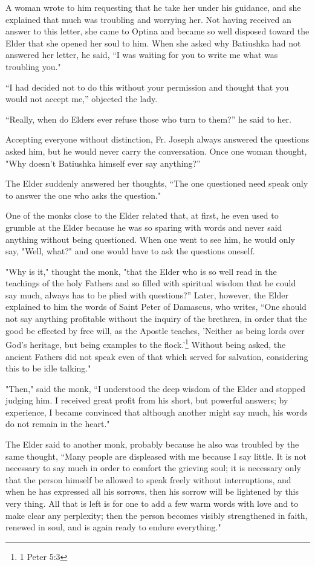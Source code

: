 A woman wrote to him requesting that he take her under his guidance, and she explained that much was troubling and worrying her. Not having received an answer to this letter, she came to Optina and became so well disposed toward the Elder that she opened her soul to him. When she asked why Batiushka had not answered her letter, he said, “I was waiting for you to write me what was troubling you."

“I had decided not to do this without your permission and thought that you would not accept me,'' objected the lady.

“Really, when do Elders ever refuse those who turn to them?” he said to her.

Accepting everyone without distinction, Fr. Joseph always answered the questions asked him, but he would never carry the conversation. Once one woman thought, "Why doesn't Batiushka himself ever say anything?”

The Elder suddenly answered her thoughts, “The one questioned need speak only to answer the one who asks the question."

One of the monks close to the Elder related that, at first, he even used to grumble at the Elder because he was so sparing with words and never said anything without being questioned. When one went to see him, he would only say, "Well, what?" and one would have to ask the questions oneself.

"Why is it," thought the monk, "that the Elder who is so well read in the teachings of the holy Fathers and so filled with spiritual wisdom that he could say much, always has to be plied with questions?” Later, however, the Elder explained to him the words of Saint Peter of Damascus, who writes, “One should not say anything profitable without the inquiry of the brethren, in order that the good be effected by free will, as the Apostle teaches, 'Neither as being lords over God's heritage, but being examples to the flock.'\footnote{1 Peter 5:3} Without being asked, the ancient Fathers did not speak even of that which served for salvation, considering this to be idle talking."

"Then," said the monk, “I understood the deep wisdom of the Elder and stopped judging him. I received great profit from his short, but powerful answers; by experience, I became convinced that although another might say much, his words do not remain in the heart."

The Elder said to another monk, probably because he also was troubled by the same thought, “Many people are displeased with me because I say little. It is not necessary to say much in order to comfort the grieving soul; it is necessary only that the person himself be allowed to speak freely without interruptions, and when he has expressed all his sorrows, then his sorrow will be lightened by this very thing. All that is left is for one to add a few warm words with love and to make clear any perplexity; then the person becomes visibly strengthened in faith, renewed in soul, and is again ready to endure everything."

